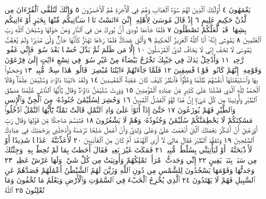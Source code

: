 يَعْمَهُونَ ٤ أُو۟لَٰٓئِكَ ٱلَّذِينَ لَهُمْ سُوٓءُ ٱلْعَذَابِ وَهُمْ فِي ٱلْأٓخِرَةِ هُمُ
ٱلْأَخْسَرُونَ ٥ وَإِنَّكَ لَتُلَقَّى ٱلْقُرْءَانَ مِن لَّدُنْ حَكِيمٍ عَلِيمٍ ٦ إِذْ قَالَ
مُوسَىٰ لِأَهْلِهِۦٓ إِنِّيٓ ءَانَسْتُ نَارࣰا سَـَٔاتِيكُم مِّنْهَا بِخَبَرٍ أَوْ ءَاتِيكُم بِشِهَابࣲ قَبَسࣲ
لَّعَلَّكُمْ تَصْطَلُونَ ٧ فَلَمَّا جَآءَهَا نُودِيَ أَنۢ بُورِكَ مَن فِي ٱلنَّارِ وَمَنْ حَوْلَهَا
وَسُبْحَٰنَ ٱللَّهِ رَبِّ ٱلْعَٰلَمِينَ ٨ يَٰمُوسَىٰٓ إِنَّهُۥٓ أَنَا ٱللَّهُ ٱلْعَزِيزُ ٱلْحَكِيمُ ٩
وَأَلْقِ عَصَاكَۚ فَلَمَّا رَءَاهَا تَهْتَزُّ كَأَنَّهَا جَآنࣱّ وَلَّىٰ مُدْبِرࣰا وَلَمْ يُعَقِّبْۚ
يَٰمُوسَىٰ لَا تَخَفْ إِنِّي لَا يَخَافُ لَدَيَّ ٱلْمُرْسَلُونَ ١٠ إِلَّا مَن ظَلَمَ ثُمَّ بَدَّلَ
حُسْنَۢا بَعْدَ سُوٓءࣲ فَإِنِّي غَفُورࣱ رَّحِيمࣱ ١١ وَأَدْخِلْ يَدَكَ فِي جَيْبِكَ تَخْرُجْ
بَيْضَآءَ مِنْ غَيْرِ سُوٓءࣲۖ فِي تِسْعِ ءَايَٰتٍ إِلَىٰ فِرْعَوْنَ وَقَوْمِهِۦٓۚ إِنَّهُمْ كَانُوا۟ قَوْمࣰا
فَٰسِقِينَ ١٢ فَلَمَّا جَآءَتْهُمْ ءَايَٰتُنَا مُبْصِرَةࣰ قَالُوا۟ هَٰذَا سِحْرࣱ مُّبِينࣱ ١٣
وَجَحَدُوا۟ بِهَا وَٱسْتَيْقَنَتْهَآ أَنفُسُهُمْ ظُلْمࣰا وَعُلُوࣰّاۚ فَٱنظُرْ كَيْفَ
كَانَ عَٰقِبَةُ ٱلْمُفْسِدِينَ ١٤ وَلَقَدْ ءَاتَيْنَا دَاوُۥدَ وَسُلَيْمَٰنَ عِلْمࣰاۖ
وَقَالَا ٱلْحَمْدُ لِلَّهِ ٱلَّذِي فَضَّلَنَا عَلَىٰ كَثِيرࣲ مِّنْ عِبَادِهِ ٱلْمُؤْمِنِينَ ١٥
وَوَرِثَ سُلَيْمَٰنُ دَاوُۥدَۖ وَقَالَ يَٰٓأَيُّهَا ٱلنَّاسُ عُلِّمْنَا مَنطِقَ
ٱلطَّيْرِ وَأُوتِينَا مِن كُلِّ شَيْءٍۖ إِنَّ هَٰذَا لَهُوَ ٱلْفَضْلُ ٱلْمُبِينُ ١٦
وَحُشِرَ لِسُلَيْمَٰنَ جُنُودُهُۥ مِنَ ٱلْجِنِّ وَٱلْإِنسِ وَٱلطَّيْرِ فَهُمْ
يُوزَعُونَ ١٧ حَتَّىٰٓ إِذَآ أَتَوْا۟ عَلَىٰ وَادِ ٱلنَّمْلِ قَالَتْ نَمْلَةࣱ يَٰٓأَيُّهَا
ٱلنَّمْلُ ٱدْخُلُوا۟ مَسَٰكِنَكُمْ لَا يَحْطِمَنَّكُمْ سُلَيْمَٰنُ وَجُنُودُهُۥ وَهُمْ
لَا يَشْعُرُونَ ١٨ فَتَبَسَّمَ ضَاحِكࣰا مِّن قَوْلِهَا وَقَالَ رَبِّ أَوْزِعْنِيٓ
أَنْ أَشْكُرَ نِعْمَتَكَ ٱلَّتِيٓ أَنْعَمْتَ عَلَيَّ وَعَلَىٰ وَٰلِدَيَّ وَأَنْ أَعْمَلَ
صَٰلِحࣰا تَرْضَىٰهُ وَأَدْخِلْنِي بِرَحْمَتِكَ فِي عِبَادِكَ ٱلصَّٰلِحِينَ ١٩
وَتَفَقَّدَ ٱلطَّيْرَ فَقَالَ مَالِيَ لَآ أَرَى ٱلْهُدْهُدَ أَمْ كَانَ
مِنَ ٱلْغَآئِبِينَ ٢٠ لَأُعَذِّبَنَّهُۥ عَذَابࣰا شَدِيدًا أَوْ لَأَا۟ذْبَحَنَّهُۥٓ
أَوْ لَيَأْتِيَنِّي بِسُلْطَٰنࣲ مُّبِينࣲ ٢١ فَمَكَثَ غَيْرَ بَعِيدࣲ فَقَالَ
أَحَطتُ بِمَا لَمْ تُحِطْ بِهِۦ وَجِئْتُكَ مِن سَبَإِۭ بِنَبَإࣲ يَقِينٍ ٢٢
إِنِّي وَجَدتُّ ٱمْرَأَةࣰ تَمْلِكُهُمْ وَأُوتِيَتْ مِن كُلِّ شَيْءࣲ وَلَهَا
عَرْشٌ عَظِيمࣱ ٢٣ وَجَدتُّهَا وَقَوْمَهَا يَسْجُدُونَ لِلشَّمْسِ
مِن دُونِ ٱللَّهِ وَزَيَّنَ لَهُمُ ٱلشَّيْطَٰنُ أَعْمَٰلَهُمْ فَصَدَّهُمْ عَنِ ٱلسَّبِيلِ
فَهُمْ لَا يَهْتَدُونَ ٢٤  ٱلَّذِي يُخْرِجُ ٱلْخَبْءَ فِي
ٱلسَّمَٰوَٰتِ وَٱلْأَرْضِ وَيَعْلَمُ مَا تُخْفُونَ وَمَا تُعْلِنُونَ ٢٥ ٱللَّهُ
